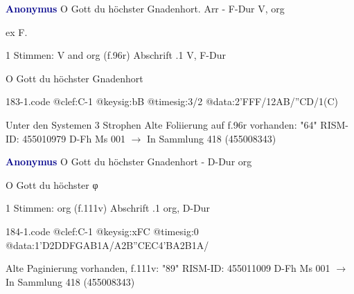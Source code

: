 \documentclass[twocolumn]{book}
\begin{document}
\newline \par \vspace{7pt} \textcolor{darkblue}{\textbf{Anonymus  }}
\newline O Gott du höchster Gnadenhort. Arr - F-Dur
\newline V, org
\newline \begin{itshape}[f.96r, at left:] ex F.\end{itshape} 
\newline \textcolor{darkblue}{}  1 Stimmen: V and org  (f.96r)
\newline Abschrift
.1  V, F-Dur
\newline \begin{footnotesize} O Gott du höchster Gnadenhort \end{footnotesize}  
\begin{filecontents*}{183-1.code}
@clef:C-1
@keysig:bB
@timesig:3/2
@data:2'FFF/12AB/''CD/1(C)
\end{filecontents*}
\newline
%
\newline Unter den Systemen 3 Strophen
\newline Alte Foliierung auf f.96r vorhanden: "64"
\newline RISM-ID: 455010979
\newline D-Fh  Ms 001
\newline $\rightarrow$ In Sammlung 418 (455008343)
      
\newline \par \vspace{7pt} \textcolor{darkblue}{\textbf{Anonymus  }}
\newline O Gott du höchster Gnadenhort - D-Dur
\newline org
\newline \begin{itshape}[f.111v, heading:] O Gott du höchster φ\end{itshape} 
\newline \textcolor{darkblue}{}  1 Stimmen: org  (f.111v)
\newline Abschrift
.1  org, D-Dur  
\begin{filecontents*}{184-1.code}
@clef:C-1
@keysig:xFC
@timesig:0
@data:1'D2DDFGAB1A/A2B''CEC4'BA2B1A/
\end{filecontents*}
\newline
%
\newline Alte Paginierung vorhanden, f.111v: "89"
\newline RISM-ID: 455011009
\newline D-Fh  Ms 001
\newline $\rightarrow$ In Sammlung 418 (455008343)
      
\end{document}
